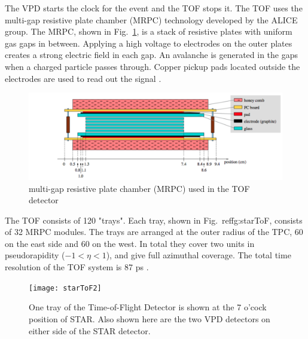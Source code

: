\documentclass[letterpaper, abstract = on,listof=totoc, bibliography=totoc]{scrreprt}
\begin{document}
The VPD starts the clock for the event and the TOF stops it. The TOF uses the multi-gap resistive plate chamber (MRPC) technology developed by the ALICE group. The MRPC, shown in Fig.~\ref{fig:MRPC}, is a stack of resistive plates with uniform gas gaps in between. Applying a high voltage to electrodes on the outer plates creates a strong electric field in each gap. An avalanche is generated in the gaps when a charged particle passes through. Copper pickup pads located outside the electrodes are used to read out the signal \cite{largeAreaTOF}. 
\begin{figure}
\begin{center}
\includegraphics[width = 1\textwidth]{MRPC}
\caption[multi-gap resistive plate chamber]{multi-gap resistive plate chamber (MRPC) used in the TOF detector \cite{largeAreaTOF}}
\label{fig:MRPC}
\end{center}
\end{figure}

The TOF consists of 120 "trays". Each tray, shown in Fig.~ref{fg:starToF}, consists of 32 MRPC modules. The trays are arranged at the outer radius of the TPC, 60 on the east side and 60 on the west. In total they cover two units in pseudorapidity ($-1<\eta<1$), and give full azimuthal coverage. The total time resolution of the TOF system is 87 ps \cite{largeAreaTOF}.   





\begin{figure}
\begin{center}
\texttt{[image: starToF2]}
\caption[STAR Time of Flight System]{One tray of the Time-of-Flight Detector is shown at the 7 o'cock position of STAR. Also shown here are the two VPD detectors on either side of the STAR detector.}
\label{fig:starToF}
\end{center}
\end{figure}
\end{document}

